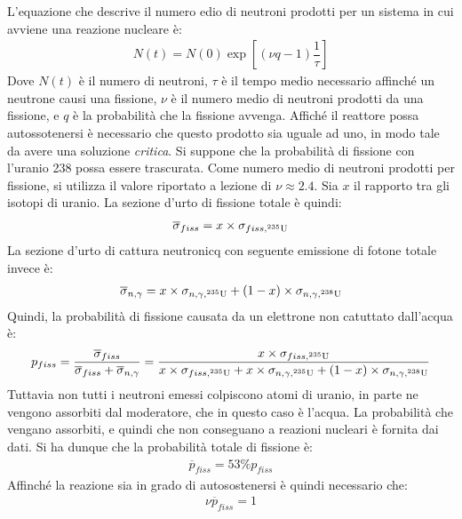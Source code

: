 \documentclass[../main.tex]{subfile}
\begin{document}
	\begin{svol}
		L'equazione che descrive il numero edio di neutroni prodotti per un sistema in cui avviene una reazione nucleare è:
		\begin{gather}
			N(t)=N(0)\exp\left[(\nu q-1)\dfrac{1}{\tau}\right]
		\end{gather}
		Dove $ N(t) $ è il numero di neutroni, $ \tau $ è il tempo medio necessario affinché un neutrone causi una fissione, $ \nu $ è il numero medio di neutroni prodotti da una fissione, e $ q $ è la probabilità che la fissione avvenga. Affiché il reattore possa autossotenersi è necessario che questo prodotto sia uguale ad uno, in modo tale da avere una soluzione \emph{critica}. Si suppone che la probabilità di fissione con l'uranio 238 possa essere trascurata. Come numero medio di neutroni prodotti per fissione, si utilizza il valore riportato a lezione di $ \nu\approx2.4 $. Sia $ x $ il rapporto tra gli isotopi di uranio. La sezione d'urto di fissione totale è quindi:
		\begin{gather}
			\overline{\sigma}_{fiss}=x\times\sigma_{fiss,^{235}\mathrm{U}}
		\end{gather}
		La sezione d'urto di cattura neutronicq con seguente emissione di fotone totale invece è:
		\begin{gather}
			\label{eqn:sigmafiss}
			\overline{\sigma}_{n,\gamma}=x\times\sigma_{n,\gamma,^{235}\mathrm{U}}+(1-x)\times\sigma_{n,\gamma,^{238}\mathrm{U}}
		\end{gather}
		Quindi, la probabilità di fissione causata da un elettrone non catuttato dall'acqua è:
		\begin{gather}
			p_{fiss}=\dfrac{\overline{\sigma}_{fiss}}{\overline{\sigma}_{fiss}+\overline{\sigma}_{n,\gamma}}=\dfrac{x\times\sigma_{fiss,^{235}\mathrm{U}}}{x\times\sigma_{fiss,^{235}\mathrm{U}}+x\times\sigma_{n,\gamma,^{235}\mathrm{U}}+(1-x)\times\sigma_{n,\gamma,^{238}\mathrm{U}}}
		\end{gather}
		Tuttavia non tutti i neutroni emessi colpiscono atomi di uranio, in parte ne vengono assorbiti dal moderatore, che in questo caso è l'acqua. La probabilità che vengano assorbiti, e quindi che non conseguano a reazioni nucleari è fornita dai dati. Si ha dunque che la probabilità totale di fissione è:
		\begin{gather}
			\overline{p}_{fiss}=53\%p_{fiss}
		\end{gather}
		Affinché la reazione sia in grado di autosostenersi è quindi necessario che:
		\begin{gather}
			\nu\overline{p}_{fiss}=1

\end{gather}
\end{svol}
\end{document}
